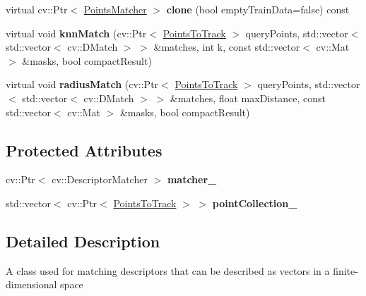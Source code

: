 \begin{DoxyCompactItemize}
\item 
\hypertarget{class_opencv_sf_m_1_1_points_matcher_a340a5cfae0d6cb8cb68f1fa77ec89993}{
virtual cv::Ptr$<$ \hyperlink{class_opencv_sf_m_1_1_points_matcher}{PointsMatcher} $>$ {\bfseries clone} (bool emptyTrainData=false) const }
\label{class_opencv_sf_m_1_1_points_matcher_a340a5cfae0d6cb8cb68f1fa77ec89993}

\item 
\hypertarget{class_opencv_sf_m_1_1_points_matcher_a922a829860b62c362b9de2344add8ec3}{
virtual void {\bfseries knnMatch} (cv::Ptr$<$ \hyperlink{class_opencv_sf_m_1_1_points_to_track}{PointsToTrack} $>$ queryPoints, std::vector$<$ std::vector$<$ cv::DMatch $>$ $>$ \&matches, int k, const std::vector$<$ cv::Mat $>$ \&masks, bool compactResult)}
\label{class_opencv_sf_m_1_1_points_matcher_a922a829860b62c362b9de2344add8ec3}

\item 
\hypertarget{class_opencv_sf_m_1_1_points_matcher_a5ad04594beba392a9939a1f8bcaaf5a2}{
virtual void {\bfseries radiusMatch} (cv::Ptr$<$ \hyperlink{class_opencv_sf_m_1_1_points_to_track}{PointsToTrack} $>$ queryPoints, std::vector$<$ std::vector$<$ cv::DMatch $>$ $>$ \&matches, float maxDistance, const std::vector$<$ cv::Mat $>$ \&masks, bool compactResult)}
\label{class_opencv_sf_m_1_1_points_matcher_a5ad04594beba392a9939a1f8bcaaf5a2}

\end{DoxyCompactItemize}
\subsection*{Protected Attributes}
\begin{DoxyCompactItemize}
\item 
\hypertarget{class_opencv_sf_m_1_1_points_matcher_a652ba26d167b0ab2dc27e8087ab8d3cf}{
cv::Ptr$<$ cv::DescriptorMatcher $>$ {\bfseries matcher\_\-}}
\label{class_opencv_sf_m_1_1_points_matcher_a652ba26d167b0ab2dc27e8087ab8d3cf}

\item 
\hypertarget{class_opencv_sf_m_1_1_points_matcher_ac6a1f04e34a72f8479814bf4eef9dfb1}{
std::vector$<$ cv::Ptr$<$ \hyperlink{class_opencv_sf_m_1_1_points_to_track}{PointsToTrack} $>$ $>$ {\bfseries pointCollection\_\-}}
\label{class_opencv_sf_m_1_1_points_matcher_ac6a1f04e34a72f8479814bf4eef9dfb1}

\end{DoxyCompactItemize}


\subsection{Detailed Description}
A class used for matching descriptors that can be described as vectors in a finite-\/dimensional space 

